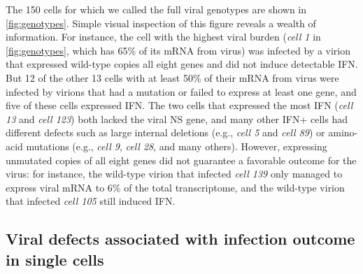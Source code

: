\documentclass[10pt,letterpaper]{article}
\newcommand{\FIG}[1]{\autoref{fig:#1}}
\begin{document}
The 150 cells for which we called the full viral genotypes are shown in \FIG{genotypes}.
Simple visual inspection of this figure reveals a wealth of information.
For instance, the cell with the highest viral burden (\textit{cell 1} in \FIG{genotypes}, which has 65\% of its mRNA from virus) was infected by a virion that expressed wild-type copies all eight genes and did not induce detectable IFN.
But 12 of the other 13 cells with at least 50\% of their mRNA from virus were infected by virions that had a mutation or failed to express at least one gene, and five of these cells expressed IFN.
The two cells that expressed the most IFN (\textit{cell 13} and \textit{cell 123}) both lacked the viral NS gene, and many other IFN+ cells had different defects such as large internal deletions (e.g., \textit{cell 5} and \textit{cell 89}) or amino-acid mutations (e.g., \textit{cell 9}, \textit{cell 28}, and many others).
However, expressing unmutated copies of all eight genes did not guarantee a favorable outcome for the virus: for instance, the wild-type virion that infected \textit{cell 139} only managed to express viral mRNA to 6\% of the total transcriptome, and the wild-type virion that infected \textit{cell 105} still induced IFN.

\subsection*{Viral defects associated with infection outcome in single cells}
\end{document}

